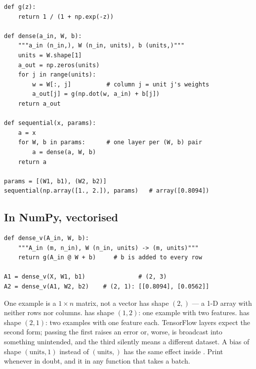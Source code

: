 \begin{lstlisting}[style=pythonml, caption={Forward propagation from scratch: a loop over units, then a loop over layers.}, label={lst:dense-loop}]
def g(z):
    return 1 / (1 + np.exp(-z))

def dense(a_in, W, b):
    """a_in (n_in,), W (n_in, units), b (units,)"""
    units = W.shape[1]
    a_out = np.zeros(units)
    for j in range(units):
        w = W[:, j]          # column j = unit j's weights
        a_out[j] = g(np.dot(w, a_in) + b[j])
    return a_out

def sequential(x, params):
    a = x
    for W, b in params:      # one layer per (W, b) pair
        a = dense(a, W, b)
    return a

params = [(W1, b1), (W2, b2)]
sequential(np.array([1., 2.]), params)   # array([0.8094])
\end{lstlisting}

\subsection{In NumPy, vectorised}

\begin{lstlisting}[style=pythonml, caption={The vectorised layer: one matrix product for all units and all examples.}, label={lst:dense-vec}]
def dense_v(A_in, W, b):
    """A_in (m, n_in), W (n_in, units) -> (m, units)"""
    return g(A_in @ W + b)     # b is added to every row

A1 = dense_v(X, W1, b1)               # (2, 3)
A2 = dense_v(A1, W2, b2)    # (2, 1): [[0.8094], [0.0562]]
\end{lstlisting}

\begin{pitfall}{One example is a $1\times n$ matrix, not a vector}
 has shape $(2,)$ --- a 1-D array with neither rows
nor columns.  has shape $(1,2)$: one example with
two features.  has shape $(2,1)$: two examples
with one feature each. TensorFlow layers expect the second form; passing the
first raises an error or, worse, is broadcast into something unintended, and the
third silently means a different dataset. A bias of shape $(\text{units},1)$
instead of $(\text{units},)$ has the same effect inside . Print
 whenever in doubt, and  it in any function that takes
a batch.
\end{pitfall}

